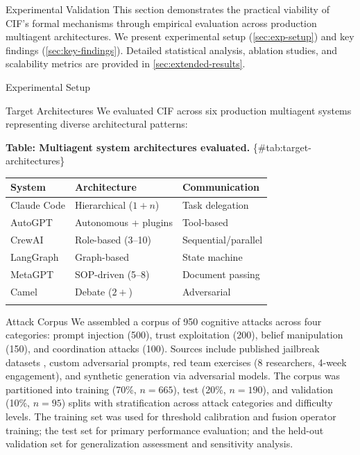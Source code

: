 \documentclass[
  ignorenonframetext,
]{beamer}
\author{\texorpdfstring{}{}}
\date{}
\newcounter{none} %
\begin{document}
\begin{frame}
\newpage
\end{frame}

\begin{frame}[fragile]{Experimental Validation}
\protect{}\label{sec:results}
This section demonstrates the practical viability of CIF's formal
mechanisms through empirical evaluation across production multiagent
architectures. We present experimental setup (\cref{sec:exp-setup}) and
key findings (\cref{sec:key-findings}). Detailed statistical analysis,
ablation studies, and scalability metrics are provided in
\cref{sec:extended-results}.

\begin{block}{Experimental Setup}
\protect{}\label{sec:exp-setup}
\begin{block}{Target Architectures}
\protect{}\label{target-architectures}
We evaluated CIF across six production multiagent systems representing
diverse architectural patterns:

\textbf{Table: Multiagent system architectures evaluated.}
\{\#tab:target-architectures\}

{\def\LTcaptype{none} %
\begin{longtable}[]{@{}lll@{}}
\toprule\noalign{}
System & Architecture & Communication \\
\midrule\noalign{}
\endhead
Claude Code & Hierarchical (\(1 + n\)) & Task delegation \\
AutoGPT & Autonomous + plugins & Tool-based \\
CrewAI & Role-based (3--10) & Sequential/parallel \\
LangGraph & Graph-based & State machine \\
MetaGPT & SOP-driven (5--8) & Document passing \\
Camel & Debate (\(2+\)) & Adversarial \\
\bottomrule\noalign{}
\end{longtable}
}
\end{block}

\begin{block}{Attack Corpus}
\protect{}\label{attack-corpus}
We assembled a corpus of 950 cognitive attacks across four categories:
prompt injection (500), trust exploitation (200), belief manipulation
(150), and coordination attacks (100). Sources include published
jailbreak datasets \cite{perez2023hackaprompt}, custom adversarial
prompts, red team exercises (8 researchers, 4-week engagement), and
synthetic generation via adversarial models. The corpus was partitioned
into training (70\%, \(n=665\)), test (20\%, \(n=190\)), and validation
(10\%, \(n=95\)) splits with stratification across attack categories and
difficulty levels. The training set was used for threshold calibration
and fusion operator training; the test set for primary performance
evaluation; and the held-out validation set for generalization
assessment and sensitivity analysis.
\end{block}


\end{block}
\end{frame}
\end{document}
